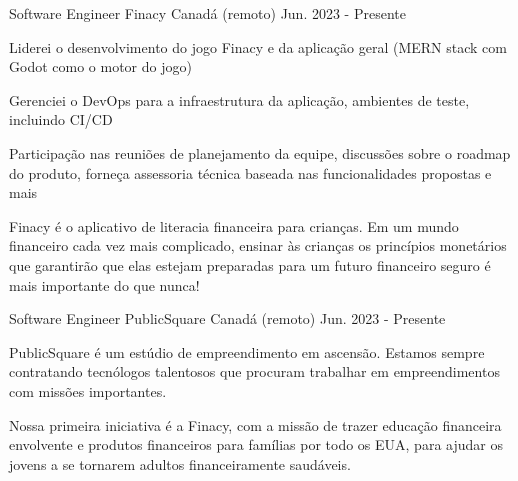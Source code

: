 

\begin{cventries}

\cventry
{Software Engineer} %
{Finacy} %
{Canadá (remoto)} %
{Jun. 2023 - Presente} %
{
  \begin{cvitems} %
    \item{Liderei o desenvolvimento do jogo Finacy e da aplicação geral (MERN stack com Godot como o motor do jogo)}
    \item {Gerenciei o DevOps para a infraestrutura da aplicação, ambientes de teste, incluindo CI/CD}
    \item {Participação nas reuniões de planejamento da equipe, discussões sobre o roadmap do produto, forneça assessoria técnica baseada nas funcionalidades propostas e mais}
    \item {Finacy é o aplicativo de literacia financeira para crianças. Em um mundo financeiro cada vez mais complicado, ensinar às crianças os princípios monetários que garantirão que elas estejam preparadas para um futuro financeiro seguro é mais importante do que nunca!}
  \end{cvitems}
}

\cventry
{Software Engineer} %
{PublicSquare} %
{Canadá (remoto)} %
{Jun. 2023 - Presente} %
{
  \begin{cvitems} %
    \item {PublicSquare é um estúdio de empreendimento em ascensão. Estamos sempre contratando tecnólogos talentosos que procuram trabalhar em empreendimentos com missões importantes.}
    \item {Nossa primeira iniciativa é a Finacy, com a missão de trazer educação financeira envolvente e produtos financeiros para famílias por todo os EUA, para ajudar os jovens a se tornarem adultos financeiramente saudáveis.}
  \end{cvitems}
}





\end{cventries}
